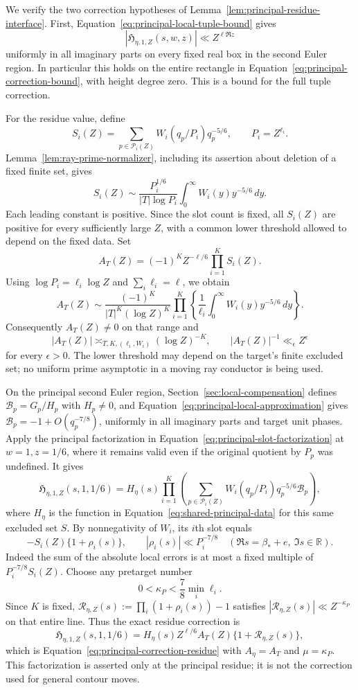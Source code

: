 We verify the two correction hypotheses of
Lemma~\ref{lem:principal-residue-interface}.  First,
Equation~\eqref{eq:principal-local-tuple-bound} gives
\[
 |\mathfrak H_{\eta,1,Z}(s,w,z)|\ll Z^{\ell\Re z}
\]
uniformly in all imaginary parts on every fixed real box in the second
Euler region.  In particular this holds on the entire rectangle in
Equation~\eqref{eq:principal-correction-bound}, with height degree zero.
This is a bound for the full tuple correction.

For the residue value, define
\[
 S_i(Z)=\sum_{p\in\mathcal P_i(Z)}W_i(q_p/P_i)q_p^{-5/6},
 \qquad P_i=Z^{\ell_i}.
\]
Lemma~\ref{lem:ray-prime-normalizer}, including its assertion about deletion
of a fixed finite set, gives
\[
 S_i(Z)\sim\frac{P_i^{1/6}}{|T|\log P_i}
       \int_0^\infty W_i(y)y^{-5/6}\,dy.
\]
Each leading constant is positive.  Since the slot count is fixed,
all \(S_i(Z)\) are positive for every sufficiently large \(Z\), with
a common lower threshold allowed to depend on the fixed data.  Set
\begin{equation}\label{eq:principal-scalar}
 A_T(Z)=(-1)^K Z^{-\ell/6}\prod_{i=1}^K S_i(Z).
\end{equation}
Using \(\log P_i=\ell_i\log Z\) and \(\sum_i\ell_i=\ell\), we obtain
\[
 A_T(Z)\sim
 \frac{(-1)^K}{|T|^K(\log Z)^K}
 \prod_{i=1}^K\left\{\frac1{\ell_i}
       \int_0^\infty W_i(y)y^{-5/6}\,dy\right\}.
\]
Consequently \(A_T(Z)\ne0\) on that range and
\[
 |A_T(Z)|\asymp_{T,K,(\ell_i,W_i)}(\log Z)^{-K},
 \qquad |A_T(Z)|^{-1}\ll_\epsilon Z^\epsilon
\]
for every \(\epsilon>0\).  The lower threshold may depend on the target's
finite excluded set; no uniform prime asymptotic in a moving ray conductor
is being used.

On the principal second Euler region, Section~\ref{sec:local-compensation}
defines \(\mathcal B_p=G_p/H_p\) with \(H_p\ne0\), and
Equation~\eqref{eq:principal-local-approximation} gives
\(\mathcal B_p=-1+O(q_p^{-7/8})\), uniformly in all imaginary parts and
target unit phases.  Apply the principal factorization in
Equation~\eqref{eq:principal-slot-factorization} at \(w=1,z=1/6\), where
it remains valid even if the original quotient by \(P_p\) was undefined.
It gives
\[
 \mathfrak H_{\eta,1,Z}(s,1,1/6)
 =H_\eta(s)\prod_{i=1}^K
       \left(\sum_{p\in\mathcal P_i(Z)}
           W_i(q_p/P_i)q_p^{-5/6}\mathcal B_p\right),
\]
where \(H_\eta\) is the function in Equation~\eqref{eq:shared-principal-data}
for this same excluded set \(S\).  By nonnegativity of \(W_i\), its \(i\)th
slot equals
\[
 -S_i(Z)\{1+\rho_i(s)\},\qquad
 |\rho_i(s)|\ll P_i^{-7/8}
 \quad(\Re s=\beta_*+e,\ \Im s\in\mathbb R).
\]
Indeed the sum of the absolute local errors is at most a fixed multiple of
\(P_i^{-7/8}S_i(Z)\).  Choose any pretarget number
\[
 0<\kappa_P<\frac78\min_i\ell_i.
\]
Since \(K\) is fixed, \(\mathcal R_{\eta,Z}(s):=\prod_i(1+\rho_i(s))-1\)
satisfies \(|\mathcal R_{\eta,Z}(s)|\ll Z^{-\kappa_P}\) on that entire line.
Thus the exact residue correction is
\[
 \mathfrak H_{\eta,1,Z}(s,1,1/6)
 =H_\eta(s)Z^{\ell/6}A_T(Z)\{1+\mathcal R_{\eta,Z}(s)\},
\]
which is Equation~\eqref{eq:principal-correction-residue} with
\(A_\eta=A_T\) and \(\mu=\kappa_P\).  This factorization is asserted
only at the principal residue; it is not the correction used for general
contour moves.

